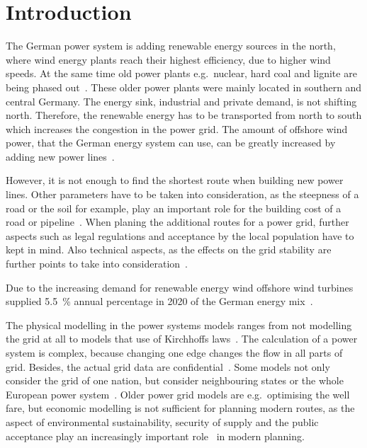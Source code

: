 \documentclass[acmtog]{acmart}
\begin{document}
	\section{Introduction}\label{sec:introduction}

	The German power system is adding renewable energy sources in the north, where wind energy plants reach their highest efficiency, due to higher wind speeds.
	At the same time old power plants e.g.\ nuclear, hard coal and lignite are being phased out~\cite{eser-frey_analyzing_2012}.
	These older power plants were mainly located in southern and central Germany. 
	The energy sink,  industrial and private demand, is not shifting north.
	Therefore, the renewable energy has to be transported from north to south which increases the congestion in the power grid. 
	The amount of offshore wind power, that the German energy system can use, can be greatly increased by adding new power lines~\cite{leuthold_nodal_2005}.
	
	However, it is not enough to find the shortest route when building new power lines.
	Other parameters have to be taken into consideration, as the steepness of a road or the soil for example, play an important role for the building cost of a road or pipeline~\cite{suleiman_optimal_2015}.
	When planing the additional routes for a power grid, further aspects such as legal regulations and acceptance
	by the local population have to kept in mind.
	Also technical aspects, as the effects on the grid stability are further points to take into consideration~\cite{schafer_understanding_2022}.
	
	Due to the increasing demand for renewable energy wind offshore wind turbines supplied 5.5~\% annual percentage in 2020 of the German energy mix~\cite{noauthor_nettostromerzeugung_2021}.

	 The physical modelling in the power systems models ranges from not modelling the grid at all to models that use of Kirchhoffs laws~\cite{bertsch_participatory_2016}.
	The calculation of a power system is complex, because changing one edge changes the flow in all parts of grid.
	Besides, the actual grid data are confidential~\cite{bertsch_participatory_2016}.
	Some models not only consider the grid of one nation, but consider neighbouring states or the whole European power system~\cite{dietrich_will_2010}.	
	Older power grid models are e.g.\ optimising the well fare, but economic modelling is not sufficient for planning modern routes, as the aspect of environmental sustainability, security of supply and the public acceptance play an increasingly important role~\cite{hauff_gesellschaftliche_2011} in modern planning.
	
\end{document}
